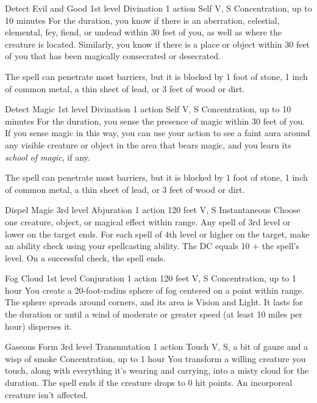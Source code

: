 \documentclass[10pt,a4paper,twoside,bg=print,twocolumn,openany,nodeprecatedcode]{dndbook}
\begin{document}
\DndSpellHeader%
{Detect Evil and Good}
{1st level Divination}
{1 action}
{Self}
{V, S}
{Concentration, up to 10 minutes}
For the duration, you know if there is an aberration, celestial, elemental, fey, fiend, or undead within 30 feet of you, as well as where the creature is located. Similarly, you know if there is a place or object within 30 feet of you that has been magically consecrated or desecrated.

The spell can penetrate most barriers, but it is blocked by 1 foot of stone, 1 inch of common metal, a thin sheet of lead, or 3 feet of wood or dirt.



\DndSpellHeader%
{Detect Magic}
{1st level Divination}
{1 action}
{Self}
{V, S}
{Concentration, up to 10 minutes}
For the duration, you sense the presence of magic within 30 feet of you. If you sense magic in this way, you can use your action to see a faint aura around any visible creature or object in the area that bears magic, and you learn its \textit{school of magic}, if any.

The spell can penetrate most barriers, but it is blocked by 1 foot of stone, 1 inch of common metal, a thin sheet of lead, or 3 feet of wood or dirt.



\DndSpellHeader%
{Dispel Magic}
{3rd level Abjuration}
{1 action}
{120 feet}
{V, S}
{Instantaneous}
Choose one creature, object, or magical effect within range. Any spell of 3rd level or lower on the target ends. For each spell of 4th level or higher on the target, make an ability check using your spellcasting ability. The DC equals 10 + the spell's level. On a successful check, the spell ends.



\DndSpellHeader%
{Fog Cloud}
{1st level Conjuration}
{1 action}
{120 feet}
{V, S}
{Concentration, up to 1 hour}
You create a 20-foot-radius sphere of fog centered on a point within range. The sphere spreads around corners, and its area is Vision and Light. It lasts for the duration or until a wind of moderate or greater speed (at least 10 miles per hour) disperses it.



\DndSpellHeader%
{Gaseous Form}
{3rd level Transmutation}
{1 action}
{Touch}
{V, S, a bit of gauze and a wisp of smoke}
{Concentration, up to 1 hour}
You transform a willing creature you touch, along with everything it's wearing and carrying, into a misty cloud for the duration. The spell ends if the creature drops to 0 hit points. An incorporeal creature isn't affected.
\end{document}
